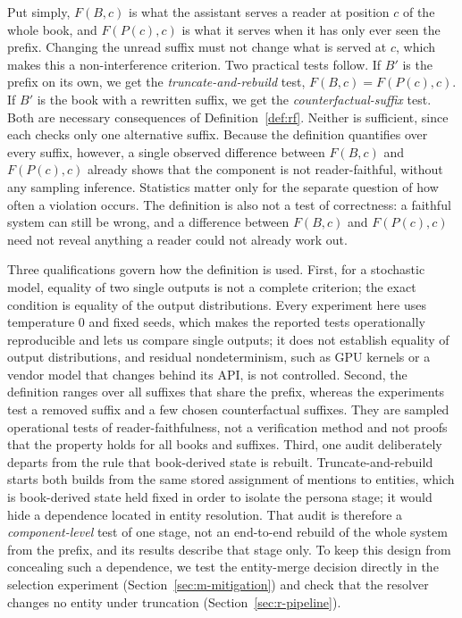 \documentclass[sn-mathphys]{sn-jnl}%
\theoremstyle{thmstyleone}%
\theoremstyle{thmstyletwo}%
\theoremstyle{thmstylethree}%
\begin{document}
Put simply, $F(B,c)$ is what the assistant serves a reader at position $c$ of the whole book, and $F(P(c),c)$ is what it serves when it has only ever seen the prefix. Changing the unread suffix must not change what is served at $c$, which makes this a non-interference criterion. Two practical tests follow. If $B'$ is the prefix on its own, we get the \emph{truncate-and-rebuild} test, $F(B,c)=F(P(c),c)$. If $B'$ is the book with a rewritten suffix, we get the \emph{counterfactual-suffix} test. Both are necessary consequences of Definition~\ref{def:rf}. Neither is sufficient, since each checks only one alternative suffix. Because the definition quantifies over every suffix, however, a single observed difference between $F(B,c)$ and $F(P(c),c)$ already shows that the component is not reader-faithful, without any sampling inference. Statistics matter only for the separate question of how often a violation occurs. The definition is also not a test of correctness: a faithful system can still be wrong, and a difference between $F(B,c)$ and $F(P(c),c)$ need not reveal anything a reader could not already work out.

Three qualifications govern how the definition is used. First, for a stochastic model, equality of two single outputs is not a complete criterion; the exact condition is equality of the output distributions. Every experiment here uses temperature 0 and fixed seeds, which makes the reported tests operationally reproducible and lets us compare single outputs; it does not establish equality of output distributions, and residual nondeterminism, such as GPU kernels or a vendor model that changes behind its API, is not controlled. Second, the definition ranges over all suffixes that share the prefix, whereas the experiments test a removed suffix and a few chosen counterfactual suffixes. They are sampled operational tests of reader-faithfulness, not a verification method and not proofs that the property holds for all books and suffixes. Third, one audit deliberately departs from the rule that book-derived state is rebuilt. Truncate-and-rebuild starts both builds from the same stored assignment of mentions to entities, which is book-derived state held fixed in order to isolate the persona stage; it would hide a dependence located in entity resolution. That audit is therefore a \emph{component-level} test of one stage, not an end-to-end rebuild of the whole system from the prefix, and its results describe that stage only. To keep this design from concealing such a dependence, we test the entity-merge decision directly in the selection experiment (Section~\ref{sec:m-mitigation}) and check that the resolver changes no entity under truncation (Section~\ref{sec:r-pipeline}).
\end{document}
